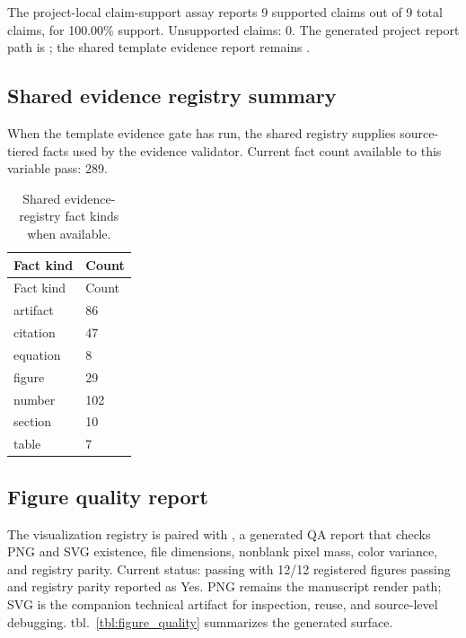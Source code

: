 \documentclass[
]{article}
\begin{document}
The project-local claim-support assay reports 9 supported claims out of
9 total claims, for 100.00\% support. Unsupported claims: 0. The
generated project report path is
; the shared
template evidence report remains
.

\subsection{Shared evidence registry
summary}\label{shared-evidence-registry-summary}

When the template evidence gate has run, the shared registry supplies
source-tiered facts used by the evidence validator. Current fact count
available to this variable pass: 289.

\begin{longtable}[]{@{}ll@{}}
\caption{Shared evidence-registry fact kinds when
available.}\label{tbl:shared_evidence_kinds}\tabularnewline
\toprule\noalign{}
Fact kind & Count \\
\midrule\noalign{}
\endfirsthead
\toprule\noalign{}
Fact kind & Count \\
\midrule\noalign{}
\endhead
\bottomrule\noalign{}
\endlastfoot
artifact & 86 \\
citation & 47 \\
equation & 8 \\
figure & 29 \\
number & 102 \\
section & 10 \\
table & 7 \\
\end{longtable}

\subsection{Figure quality report}\label{figure-quality-report}

The visualization registry is paired with
, a generated QA
report that checks PNG and SVG existence, file dimensions, nonblank
pixel mass, color variance, and registry parity. Current status: passing
with 12/12 registered figures passing and registry parity reported as
Yes. PNG remains the manuscript render path; SVG is the companion
technical artifact for inspection, reuse, and source-level debugging.
tbl.~\ref{tbl:figure_quality} summarizes the generated surface.
\end{document}
